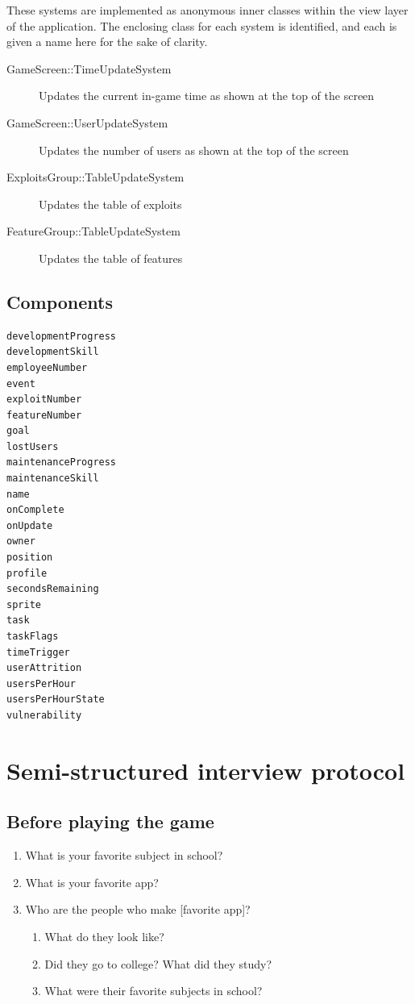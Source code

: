 \documentclass[letterpaper]{article}
\begin{document}
These systems are implemented as anonymous inner classes within the
view layer of the application.  The enclosing class for each system is
identified, and each is given a name here for the sake of clarity.

\begin{description}
\item[GameScreen::TimeUpdateSystem] Updates the current in-game time
 as shown at the top of the screen
\item[GameScreen::UserUpdateSystem] Updates the number of users as shown
 at the top of the screen
\item[ExploitsGroup::TableUpdateSystem] Updates the table of exploits
\item[FeatureGroup::TableUpdateSystem] Updates the table of features
\end{description}

\clearpage
\subsection*{Components}
\begin{multicols}{2}
\begin{verbatim}
developmentProgress
developmentSkill
employeeNumber
event
exploitNumber
featureNumber
goal
lostUsers
maintenanceProgress
maintenanceSkill
name
onComplete
onUpdate
owner
position
profile
secondsRemaining
sprite
task
taskFlags
timeTrigger
userAttrition
usersPerHour
usersPerHourState
vulnerability
\end{verbatim}
\end{multicols}

\clearpage
\section{Semi-structured interview protocol}
\label{appendix:interview-protocol}

\subsection*{Before playing the game}

\begin{enumerate}
\item What is your favorite subject in school?
\item What is your favorite app?
\item Who are the people who make [favorite app]?
\begin{enumerate}
\item What do they look like?
\item Did they go to college? What did they study?
\item What were their favorite subjects in school?
\end{enumerate}
\end{enumerate}
\end{document}
